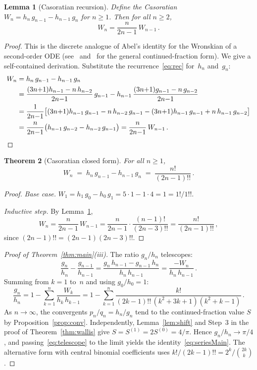 \documentclass[11pt]{article}
\newcommand{\dff}[1]{(#1)!!}
\newtheorem{theorem}{Theorem}[section]
\newtheorem{lemma}[theorem]{Lemma}
\theoremstyle{remark}
\begin{document}
\begin{lemma}[Casoratian recursion]\label{lem:casoratian}
Define the Casoratian $W_n = h_n\,g_{n-1} - h_{n-1}\,g_n$ for $n \geq 1$.
Then for all $n \geq 2$,
\[
  W_n = \frac{n}{2n{-}1}\,W_{n-1}\,.
\]
\end{lemma}

\begin{proof}
This is the discrete analogue of Abel's identity for the
Wronskian of a second-order ODE
(see~\cite[\S7.2]{cuyt2008handbook}
and~\cite[Ch.~2]{lorentzen2008continued} for the general
continued-fraction form).
We give a self-contained derivation.
Substitute the recurrence~\eqref{eq:rec} for~$h_n$
and~$g_n$:
\begin{align*}
  W_n &= h_n\,g_{n-1} - h_{n-1}\,g_n \\
  &= \frac{(3n{+}1)h_{n-1} - n\,h_{n-2}}{2n{-}1}\,g_{n-1}
    - h_{n-1}\,\frac{(3n{+}1)g_{n-1} - n\,g_{n-2}}{2n{-}1} \\
  &= \frac{1}{2n{-}1}\bigl[
    (3n{+}1)h_{n-1}\,g_{n-1} - n\,h_{n-2}\,g_{n-1}
    - (3n{+}1)h_{n-1}\,g_{n-1} + n\,h_{n-1}\,g_{n-2}
    \bigr] \\
  &= \frac{n}{2n{-}1}\bigl(h_{n-1}\,g_{n-2} - h_{n-2}\,g_{n-1}\bigr)
   = \frac{n}{2n{-}1}\,W_{n-1}\,.\qedhere
\end{align*}
\end{proof}

\begin{theorem}[Casoratian closed form]\label{thm:casoratian}
For all $n \geq 1$,
\[
  W_n \;=\; h_n\,g_{n-1} - h_{n-1}\,g_n \;=\; \frac{n!}{\dff{2n{-}1}}\,.
\]
\end{theorem}

\begin{proof}
\emph{Base case.}  $W_1 = h_1\,g_0 - h_0\,g_1 = 5\cdot 1 - 1\cdot 4 = 1 = 1!/1!!$.

\emph{Inductive step.}  By Lemma~\ref{lem:casoratian},
\[
  W_n = \frac{n}{2n{-}1}\,W_{n-1}
  = \frac{n}{2n{-}1}\cdot\frac{(n{-}1)!}{\dff{2n{-}3}}
  = \frac{n!}{\dff{2n{-}1}}\,,
\]
since $\dff{2n{-}1} = (2n{-}1)\dff{2n{-}3}$.
\end{proof}

\begin{proof}[Proof of Theorem~\ref{thm:main}\textup{(iii)}]
The ratio $g_n/h_n$ telescopes:
\[
  \frac{g_n}{h_n} - \frac{g_{n-1}}{h_{n-1}}
  = \frac{g_n\,h_{n-1} - g_{n-1}\,h_n}{h_n\,h_{n-1}}
  = \frac{-W_n}{h_n\,h_{n-1}}\,.
\]
Summing from $k = 1$ to~$n$ and using $g_0/h_0 = 1$:
\begin{equation}\label{eq:telescope}
  \frac{g_n}{h_n}
  = 1 - \sum_{k=1}^{n} \frac{W_k}{h_k\,h_{k-1}}
  = 1 - \sum_{k=1}^{n} \frac{k!}{\dff{2k{-}1}\,(k^2{+}3k{+}1)(k^2{+}k{-}1)}\,.
\end{equation}
As $n\to\infty$, the convergents $p_n/q_n = h_n/g_n$ tend to the
continued-fraction value $S$ by Proposition~\ref{prop:conv}.
Independently, Lemma~\ref{lem:shift} and Step~3 in the proof of
Theorem~\ref{thm:wallis} give $S = S^{(1)} = 2S^{(0)} = 4/\pi$.
Hence $g_n/h_n \to \pi/4$, and passing~\eqref{eq:telescope} to the
limit yields the identity~\eqref{eq:seriesMain}.
The alternative form with central binomial coefficients uses
$k!/\dff{2k{-}1} = 2^k/\binom{2k}{k}$.
\end{proof}
\end{document}
